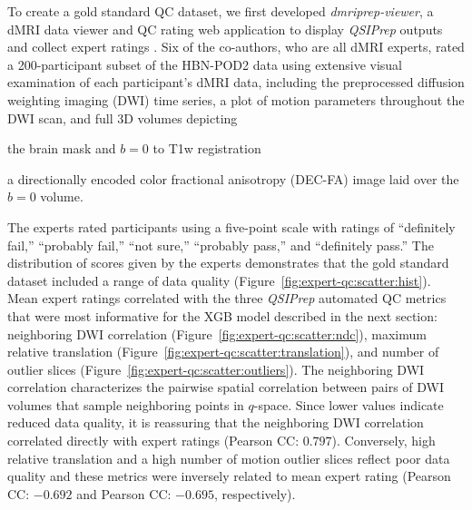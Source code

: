 \documentclass[9pt,lineno]{elife}
\begin{document}
To create a gold standard QC dataset, we first developed \emph{dmriprep-viewer},
a dMRI data viewer and QC rating web application to display \emph{QSIPrep}
outputs and collect expert ratings \citep{richie-halford2021-viewer}. Six of the
co-authors, who are all dMRI experts, rated a 200-participant subset of the
HBN-POD2 data using extensive visual examination of each participant's dMRI data,
including the preprocessed diffusion weighting imaging (DWI) time series, a plot of
motion parameters throughout the DWI scan, and full 3D volumes depicting
\begin{enumerate*}[%
    label=(\roman*),%
    before={{ }},%
    itemjoin={{, }},%
    itemjoin*={{ and }}]
    \item the brain mask and $b=0$ to T1w registration
    \item a directionally encoded color fractional anisotropy (DEC-FA) image laid over the $b=0$ volume.
\end{enumerate*}
The experts rated participants using a five-point scale with ratings of ``definitely
fail,'' ``probably fail,'' ``not sure,'' ``probably pass,'' and ``definitely
pass.'' The distribution of scores given by the experts demonstrates that the
gold standard dataset included a range of data quality (Figure~\ref{fig:expert-qc:scatter:hist}). Mean expert ratings
correlated with the three \emph{QSIPrep} automated QC metrics that were most informative for the XGB model described in the next section:
neighboring DWI correlation \citep{yeh2019-kb} (Figure~\ref{fig:expert-qc:scatter:ndc}), maximum relative
translation (Figure~\ref{fig:expert-qc:scatter:translation}), and number of outlier slices (Figure~\ref{fig:expert-qc:scatter:outliers}). The neighboring DWI correlation characterizes
the pairwise spatial correlation between pairs of DWI volumes that sample
neighboring points in $q$-space. Since lower values indicate reduced data
quality, it is reassuring that the neighboring DWI correlation correlated directly with expert ratings
(Pearson CC: $0.797$). Conversely, high relative translation and a high number of
motion outlier slices reflect poor data quality and these metrics were inversely
related to mean expert rating (Pearson CC: $-0.692$ and Pearson CC: $-0.695$,
respectively).
\end{document}
